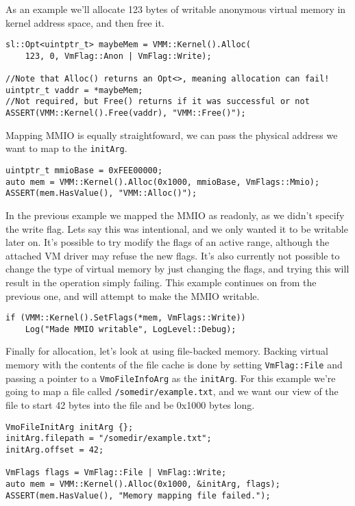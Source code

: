 As an example we'll allocate 123 bytes of writable anonymous virtual memory in kernel address space, and then free it.
\begin{lstlisting}
sl::Opt<uintptr_t> maybeMem = VMM::Kernel().Alloc(
    123, 0, VmFlag::Anon | VmFlag::Write);

//Note that Alloc() returns an Opt<>, meaning allocation can fail!
uintptr_t vaddr = *maybeMem;
//Not required, but Free() returns if it was successful or not
ASSERT(VMM::Kernel().Free(vaddr), "VMM::Free()");
\end{lstlisting}

Mapping MMIO is equally straightfoward, we can pass the physical address we want to map to the \lstinline{initArg}.
\begin{lstlisting}
uintptr_t mmioBase = 0xFEE00000;
auto mem = VMM::Kernel().Alloc(0x1000, mmioBase, VmFlags::Mmio);
ASSERT(mem.HasValue(), "VMM::Alloc()");
\end{lstlisting}

In the previous example we mapped the MMIO as readonly, as we didn't specify the write flag. Lets say this was intentional, and we only wanted it to be writable later on. It's possible to try modify the flags of an active range, although the attached VM driver may refuse the new flags. It's also currently not possible to change the type of virtual memory by just changing the flags, and trying this will result in the operation simply failing. This example continues on from the previous one, and will attempt to make the MMIO writable.
\begin{lstlisting}
if (VMM::Kernel().SetFlags(*mem, VmFlags::Write))
    Log("Made MMIO writable", LogLevel::Debug);
\end{lstlisting}

Finally for allocation, let's look at using file-backed memory. Backing virtual memory with the contents of the file cache is done by setting \lstinline{VmFlag::File} and passing a pointer to a \lstinline{VmoFileInfoArg} as the \verb|initArg|. For this example we're going to map a file called \verb|/somedir/example.txt|, and we want our view of the file to start 42 bytes into the file and be 0x1000 bytes long.

\begin{lstlisting}
VmoFileInitArg initArg {};
initArg.filepath = "/somedir/example.txt";
initArg.offset = 42;

VmFlags flags = VmFlag::File | VmFlag::Write;
auto mem = VMM::Kernel().Alloc(0x1000, &initArg, flags);
ASSERT(mem.HasValue(), "Memory mapping file failed.");
\end{lstlisting}

